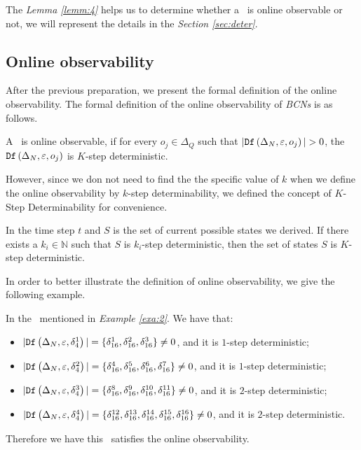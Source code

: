 The {\em Lemma \ref{lemm:4}} helps us to determine whether a \BCN\ is online observable or not, we will represent the details in the {\em Section \ref{sec:deter}}.
\subsection{Online observability}
After the previous preparation, we present the formal definition of the online observability. The formal definition of the online observability of {\em BCNs} is as follows.

\begin{definition}
 A \BCN\ is online observable,
if for every  $o_j \in \Delta_Q$ such that $|\Ded\left(\Delta_N,\varepsilon, o_j\right)|> 0$, the ${\tt Df}\left(\Delta_N,\varepsilon,o_j\right)$ is $K$-step deterministic.
\end{definition}

However, since we don not need to find the the specific value of $k$ when we define the online observability by $k$-step determinability, we defined the concept of $K$-Step Determinability for convenience.
\begin{definition} 
 In the time step $t$ and $S$ is the set of current possible states we derived. If there exists a $k_i\in \mathbb{N}$ such that $S$ is $k_i$-step deterministic, then the set of states $S$ is $K$-step deterministic.
\end{definition}

 In order to better illustrate the definition of online observability, we give the following example.

\begin{example}
In the \BCN\ mentioned in {\em Example \ref{exa:2}}.  We have that:
 \begin{itemize}
 \item $|{\tt Df}\left(\Delta_N,\varepsilon, \delta_{4}^1\right)|=\{\delta_{16}^1,\delta_{16}^2,\delta_{16}^3\}\neq 0$, and it is $1$-step deterministic;
 \item $|{\tt Df}\left(\Delta_N,\varepsilon, \delta_{4}^2\right)|=\{\delta_{16}^4,\delta_{16}^5,\delta_{16}^6,\delta_{16}^7\}\neq 0$, and it is $1$-step deterministic;
 \item $|{\tt Df}\left(\Delta_N,\varepsilon, \delta_{4}^3\right)|=\{\delta_{16}^8,\delta_{16}^9,\delta_{16}^{10},\delta_{16}^{11}\}\neq 0$, and it is $2$-step deterministic;
 \item $|{\tt Df}\left(\Delta_N,\varepsilon, \delta_{4}^4\right)|=\{\delta_{16}^{12},\delta_{16}^{13},\delta_{16}^{14},\delta_{16}^{15},\delta_{16}^{16}\}\neq 0$, and it is $2$-step deterministic.
 \end{itemize}
 
Therefore we have this \BCN\ satisfies the online observability.
\end{example}  

